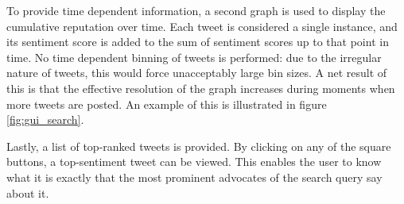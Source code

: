 To provide time dependent information, a second graph is used to display the cumulative reputation over time. Each tweet is considered a single instance, and its sentiment score is added to the sum of sentiment scores up to that point in time. No time dependent binning of tweets is performed: due to the irregular nature of tweets, this would force unacceptably large bin sizes. A net result of this is that the effective resolution of the graph increases during moments when more tweets are posted. An example of this is illustrated in figure \ref{fig:gui_search}.

Lastly, a list of top-ranked tweets is provided. By clicking on any of the square buttons, a top-sentiment tweet can be viewed. This enables the user to know what it is exactly that the most prominent advocates of the search query say about it.








